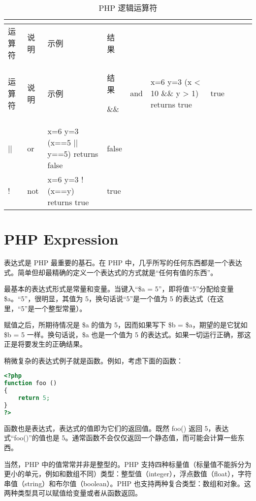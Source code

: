 \begin{longtable}{|m{35pt}|m{60pt}|m{200pt}|m{30pt}|}
\tabularnewline\hline
运算符	&说明	&示例	&结果
\endhead

\caption{PHP 逻辑运算符}\\
\hline
运算符	&说明	&示例	&结果
\endfirsthead

\endfoot

\endlastfoot
\hline
\&\&	&and	 				&x=6 \newline y=3 \newline (x < 10 \&\& y > 1) returns true&true\\
\hline
||		&or	 					& x=6 \newline y=3 \newline (x==5 || y==5) returns false&false\\
\hline
!		&not	 				& x=6 \newline y=3 \newline !(x==y) returns true		&true\\
\hline
\end{longtable}



\chapter{PHP Expression}


表达式是 PHP 最重要的基石。在 PHP 中，几乎所写的任何东西都是一个表达式。简单但却最精确的定义一个表达式的方式就是“任何有值的东西”。

最基本的表达式形式是常量和变量。当键入“\$a = 5”，即将值“5”分配给变量 \$a。“5”，很明显，其值为 5，换句话说“5”是一个值为 5 的表达式（在这里，“5”是一个整型常量）。

赋值之后，所期待情况是 \$a 的值为 5，因而如果写下 \$b = \$a，期望的是它犹如 \$b = 5 一样。换句话说，\$a 也是一个值为 5 的表达式。如果一切运行正确，那这正是将要发生的正确结果。

稍微复杂的表达式例子就是函数。例如，考虑下面的函数：

\begin{lstlisting}[language=PHP]
<?php
function foo ()
{
    return 5;
}
?>
\end{lstlisting}

函数也是表达式，表达式的值即为它们的返回值。既然 foo() 返回 5，表达式“foo()”的值也是 5。通常函数不会仅仅返回一个静态值，而可能会计算一些东西。

当然，PHP 中的值常常并非是整型的。PHP 支持四种标量值（标量值不能拆分为更小的单元，例如和数组不同）类型：整型值（integer），浮点数值（float），字符串值（string）和布尔值（boolean）。PHP 也支持两种复合类型：数组和对象。这两种类型具可以赋值给变量或者从函数返回。

